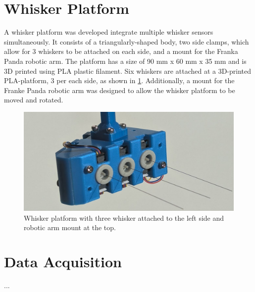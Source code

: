 \section{Whisker Platform}

A whisker platform was developed integrate multiple whisker sensors simultaneously.
It consists of a triangularly-shaped body, two side clamps, which allow for 3 whiskers to be attached on each side, and a mount for the Franka Panda robotic arm.
The platform has a size of 90 mm x 60 mm x 35 mm and is 3D printed using PLA plastic filament.
Six whiskers are attached at a 3D-printed PLA-platform, 3 per each side, as shown in \cref{fig:whisker_platform}.
Additionally, a mount for the Franke Panda robotic arm was designed to allow the whisker platform to be moved and rotated.

\begin{figure}[ht]
    \centering
    \includegraphics[width=0.8\textheight]{figures/platform}
    \caption{Whisker platform with three whisker attached to the left side and robotic arm mount at the top.}
    \label{fig:whisker_platform}
\end{figure}

\section{Data Acquisition}
...

